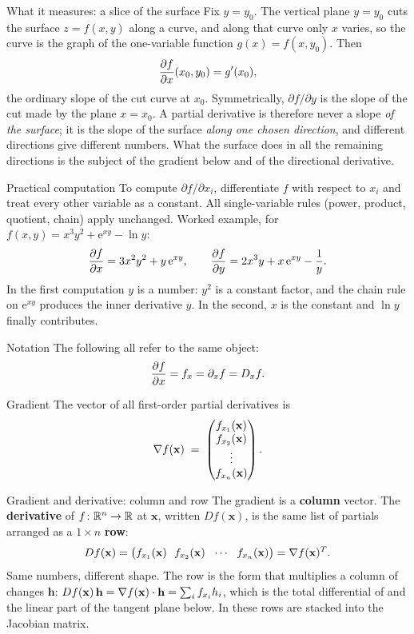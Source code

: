 \begin{rulebox}{What it measures: a slice of the surface}
Fix $y=y_{0}$. The vertical plane $y=y_{0}$ cuts the surface $z=f(x,y)$
along a curve, and along that curve only $x$ varies, so the curve is the
graph of the one-variable function $g(x)=f(x,y_{0})$. Then
\[
  \frac{\partial f}{\partial x}(x_{0},y_{0})=g'(x_{0}),
\]
the ordinary slope of the cut curve at $x_{0}$. Symmetrically,
$\partial f/\partial y$ is the slope of the cut made by the plane
$x=x_{0}$. A partial derivative is therefore never a slope \emph{of the
surface}; it is the slope of the surface \emph{along one chosen direction},
and different directions give different numbers. What the surface does in
all the remaining directions is the subject of the gradient below and of the
directional derivative.
\end{rulebox}

\begin{rulebox}{Practical computation}
To compute $\partial f/\partial x_i$, differentiate $f$ with respect to
$x_i$ and treat every other variable as a constant. All single-variable
rules (power, product, quotient, chain) apply unchanged. Worked example, for
$f(x,y)=x^{3}y^{2}+\mathrm{e}^{xy}-\ln y$:
\[
  \frac{\partial f}{\partial x}=3x^{2}y^{2}+y\,\mathrm{e}^{xy},
  \qquad
  \frac{\partial f}{\partial y}=2x^{3}y+x\,\mathrm{e}^{xy}-\frac{1}{y} .
\]
In the first computation $y$ is a number: $y^{2}$ is a constant factor, and
the chain rule on $\mathrm{e}^{xy}$ produces the inner derivative $y$. In
the second, $x$ is the constant and $\ln y$ finally contributes.
\end{rulebox}

\begin{rulebox}{Notation}
The following all refer to the same object:
\[
  \frac{\partial f}{\partial x} = f_x = \partial_x f = D_x f .
\]
\end{rulebox}

\begin{rulebox}{Gradient}
The vector of all first-order partial derivatives is
\[
  \nabla f(\mathbf{x}) \;=\;
  \begin{pmatrix} f_{x_1}(\mathbf{x}) \\ f_{x_2}(\mathbf{x}) \\ \vdots \\
    f_{x_n}(\mathbf{x}) \end{pmatrix} .
\]
\end{rulebox}

\begin{rulebox}{Gradient and derivative: column and row}
The gradient is a \textbf{column} vector. The \textbf{derivative} of
$f\colon\mathbb{R}^{n}\to\mathbb{R}$ at $\mathbf{x}$, written $Df(\mathbf{x})$, is the same
list of partials arranged as a $1\times n$ \textbf{row}:
\[
  Df(\mathbf{x})=\bigl(f_{x_1}(\mathbf{x})\ \ f_{x_2}(\mathbf{x})\ \ \cdots\ \
  f_{x_n}(\mathbf{x})\bigr)=\grad f(\mathbf{x})^{T} .
\]
Same numbers, different shape. The row is the form that multiplies a column
of changes $\mathbf{h}$:
$Df(\mathbf{x})\,\mathbf{h}=\nabla f(\mathbf{x})\cdot\mathbf{h}
=\sum_{i}f_{x_i}h_{i}$, which is the total differential of  and
the linear part of the tangent plane below. In \chref{derivatives}{13} these rows are
stacked into the Jacobian matrix.
\end{rulebox}

